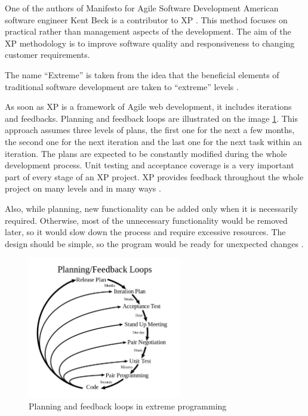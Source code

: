 One of the authors of Manifesto for Agile Software Development American software engineer Kent Beck is a contributor to XP \cite{xp_explained}. This method focuses on practical rather than management aspects of the development. The aim of the XP methodology is to improve software quality and responsiveness to changing customer requirements.

The name ``Extreme'' is taken from the idea that the beneficial elements of traditional software development are taken to ``extreme'' levels \cite[Preface]{xp_explained}.

As soon as XP is a framework of Agile web development, it includes iterations and feedbacks. Planning and feedback loops are illustrated on the image \ref{fig:xp_loop}. This approach assumes three levels of plans, the first one for the next a few months, the second one for the next iteration and the last one for the next task within an iteration. The plans are expected to be constantly modified during the whole development process. Unit testing and acceptance coverage is a very important part of every stage of an XP project. XP provides feedback throughout the whole project on many levels and in many ways \cite[Planning/Feedback loops]{xp_intro}.

Also, while planning, new functionality can be added only when it is necessarily required. Otherwise, most of the unnecessary functionality would be removed later, so it would slow down the process and require excessive resources. The design should be simple, so the program would be ready for unexpected changes \cite{xp_early}.

\begin{figure}[h]
    \centerline{\includegraphics[width=0.6\textwidth]{images/xp_loop}}
    \caption{Planning and feedback loops in extreme programming}
    \label{fig:xp_loop}
\end{figure}

